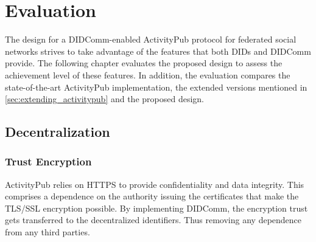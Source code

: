 \chapter{Evaluation}
\label{cha:evaluation}


The design for a DIDComm-enabled ActivityPub protocol for federated social networks strives to take advantage of the features that both DIDs and DIDComm provide. The following chapter evaluates the proposed design to assess the achievement level of these features. In addition, the evaluation compares the state-of-the-art ActivityPub implementation, the extended versions mentioned in \ref{sec:extending_activitypub} and the proposed design.

\section{Decentralization}
\subsection{Trust Encryption}
ActivityPub relies on HTTPS to provide confidentiality and data integrity. This comprises a dependence on the authority issuing the certificates that make the TLS/SSL encryption possible. By implementing DIDComm, the encryption trust gets transferred to the decentralized identifiers. Thus removing any dependence from any third parties. 

